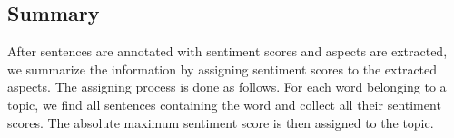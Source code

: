 \subsection{Summary}
\label{Summary}
After sentences are annotated with sentiment scores and aspects are extracted, we summarize the information by assigning sentiment scores to the extracted aspects. The assigning process is done as follows. For each word belonging to a topic, we find all sentences containing the word and collect all their sentiment scores. The absolute maximum sentiment score is then assigned to the topic.



